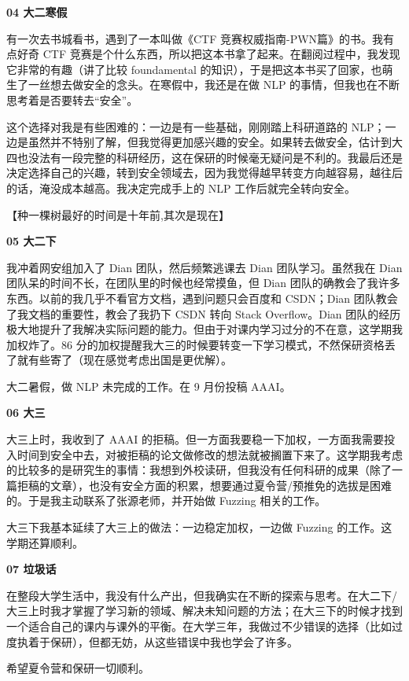 \textbf{04 大二寒假}

有一次去书城看书，遇到了一本叫做《CTF
竞赛权威指南-PWN篇》的书。我有点好奇 CTF
竞赛是个什么东西，所以把这本书拿了起来。在翻阅过程中，我发现它非常的有趣（讲了比较
foundamental
的知识），于是把这本书买了回家，也萌生了一丝想去做安全的念头。在寒假中，我还是在做
NLP 的事情，但我也在不断思考着是否要转去``安全''。

这个选择对我是有些困难的：一边是有一些基础，刚刚踏上科研道路的
NLP；一边是虽然并不特别了解，但我觉得更加感兴趣的安全。如果转去做安全，估计到大四也没法有一段完整的科研经历，这在保研的时候毫无疑问是不利的。我最后还是决定选择自己的兴趣，转到安全领域去，因为我觉得越早转变方向越容易，越往后的话，淹没成本越高。我决定完成手上的
NLP 工作后就完全转向安全。

【种一棵树最好的时间是十年前,其次是现在】

\textbf{05 大二下}

我冲着网安组加入了 Dian 团队，然后频繁逃课去 Dian 团队学习。虽然我在
Dian 团队呆的时间不长，在团队里的时候也经常摸鱼，但 Dian
团队的确教会了我许多东西。以前的我几乎不看官方文档，遇到问题只会百度和
CSDN；Dian 团队教会了我文档的重要性，教会了我扔下 CSDN 转向 Stack
Overflow。Dian
团队的经历极大地提升了我解决实际问题的能力。但由于对课内学习过分的不在意，这学期我加权炸了。86
分的加权提醒我大三的时候要转变一下学习模式，不然保研资格丢了就有些寄了（现在感觉考虑出国是更优解）。

大二暑假，做 NLP 未完成的工作。在 9 月份投稿 AAAI。

\textbf{06 大三}

大三上时，我收到了 AAAI
的拒稿。但一方面我要稳一下加权，一方面我需要投入时间到安全中去，对被拒稿的论文做修改的想法就被搁置下来了。这学期我考虑的比较多的是研究生的事情：我想到外校读研，但我没有任何科研的成果（除了一篇拒稿的文章），也没有安全方面的积累，想要通过夏令营/预推免的选拔是困难的。于是我主动联系了张源老师，并开始做
Fuzzing 相关的工作。

大三下我基本延续了大三上的做法：一边稳定加权，一边做 Fuzzing
的工作。这学期还算顺利。

\textbf{07 垃圾话}

在整段大学生活中，我没有什么产出，但我确实在不断的探索与思考。在大二下/大三上时我才掌握了学习新的领域、解决未知问题的方法；在大三下的时候才找到一个适合自己的课内与课外的平衡。在大学三年，我做过不少错误的选择（比如过度执着于保研），但都无妨，从这些错误中我也学会了许多。

希望夏令营和保研一切顺利。


